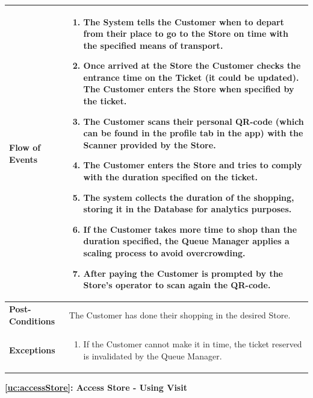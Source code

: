 \documentclass[a4paper, 12pt, oneside]{article}
\begin{document}
\begin{enumerate}[labelindent=20pt, label={UC.\arabic*}, itemindent=1em,leftmargin=!]
\begin{tabularx}{\linewidth}{| l | X |}
    \hline
    \textbf{Flow of Events} & \parbox{0.7\textwidth}{   
        \begin{enumerate}
            \item The System tells the Customer when to depart from their place to go to the Store on time with the specified means of transport.
            \item Once arrived at the Store the Customer checks the entrance time on the Ticket (it could be updated). The Customer enters the Store when specified by the ticket.
            \item The Customer scans their personal QR-code (which can be found in the profile tab in the app) with the Scanner provided by the Store.
            \item The Customer enters the Store and tries to comply with the duration specified on the ticket.
            \item The system collects the duration of the shopping, storing it in the Database for analytics purposes.
            \item If the Customer takes more time to shop than the duration specified, the Queue Manager applies a scaling process to avoid overcrowding.
            \item After paying the Customer is prompted by the Store's operator to scan again the QR-code.
    \end{enumerate}}\\
    
    \hline
    \textbf{Post-Conditions} & The Customer has done their shopping in the desired Store.\\
    
    \hline
    \textbf{Exceptions} & \parbox{0.7\textwidth}{ \begin{enumerate}
            \item If the Customer cannot make it in time, the ticket reserved is invalidated by the Queue Manager.
        \end{enumerate}}\\

    \hline
    
\end{tabularx}

\begin{center}
{\textbf{\ref{uc:accessStore}: Access Store - Using Visit}}
\end{center}
\begin{tabularx}{\linewidth}{| l | X |}
    

\end{tabularx}
\end{enumerate}
\end{document}
